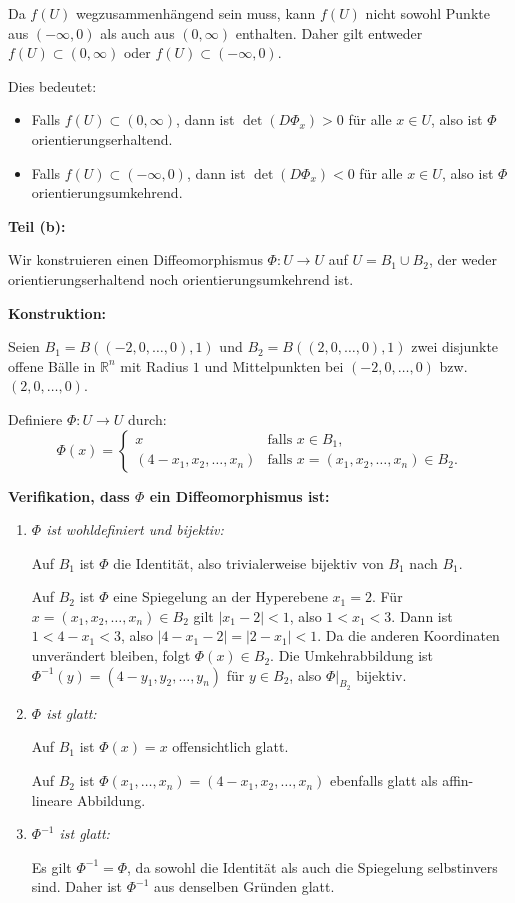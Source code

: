 \documentclass{article}
\newcommand{\R}{\mathbb{R}}
\begin{document}
Da $f(U)$ wegzusammenhängend sein muss, kann $f(U)$ nicht sowohl Punkte aus $(-\infty, 0)$ als auch aus $(0, \infty)$ enthalten. Daher gilt entweder $f(U) \subset (0, \infty)$ oder $f(U) \subset (-\infty, 0)$.

Dies bedeutet:
\begin{itemize}
    \item Falls $f(U) \subset (0, \infty)$, dann ist $\det(D\Phi_x) > 0$ für alle $x \in U$, also ist $\Phi$ orientierungserhaltend.
    \item Falls $f(U) \subset (-\infty, 0)$, dann ist $\det(D\Phi_x) < 0$ für alle $x \in U$, also ist $\Phi$ orientierungsumkehrend.
\end{itemize}

\textbf{Teil (b):}

Wir konstruieren einen Diffeomorphismus $\Phi: U \to U$ auf $U = B_1 \cup B_2$, der weder orientierungserhaltend noch orientierungsumkehrend ist.

\textbf{Konstruktion:}

Seien $B_1 = B((-2, 0, \ldots, 0), 1)$ und $B_2 = B((2, 0, \ldots, 0), 1)$ zwei disjunkte offene Bälle in $\R^n$ mit Radius $1$ und Mittelpunkten bei $(-2, 0, \ldots, 0)$ bzw. $(2, 0, \ldots, 0)$.

Definiere $\Phi: U \to U$ durch:
\[
\Phi(x) = \begin{cases}
    x & \text{falls } x \in B_1, \\
    (4 - x_1, x_2, \ldots, x_n) & \text{falls } x = (x_1, x_2, \ldots, x_n) \in B_2.
\end{cases}
\]

\textbf{Verifikation, dass $\Phi$ ein Diffeomorphismus ist:}

\begin{enumerate}
    \item \textit{$\Phi$ ist wohldefiniert und bijektiv:} 
    
    Auf $B_1$ ist $\Phi$ die Identität, also trivialerweise bijektiv von $B_1$ nach $B_1$.
    
    Auf $B_2$ ist $\Phi$ eine Spiegelung an der Hyperebene $x_1 = 2$. Für $x = (x_1, x_2, \ldots, x_n) \in B_2$ gilt $|x_1 - 2| < 1$, also $1 < x_1 < 3$. Dann ist $1 < 4 - x_1 < 3$, also $|4 - x_1 - 2| = |2 - x_1| < 1$. Da die anderen Koordinaten unverändert bleiben, folgt $\Phi(x) \in B_2$. Die Umkehrabbildung ist $\Phi^{-1}(y) = (4 - y_1, y_2, \ldots, y_n)$ für $y \in B_2$, also $\Phi|_{B_2}$ bijektiv.
    
    \item \textit{$\Phi$ ist glatt:} 
    
    Auf $B_1$ ist $\Phi(x) = x$ offensichtlich glatt.
    
    Auf $B_2$ ist $\Phi(x_1, \ldots, x_n) = (4 - x_1, x_2, \ldots, x_n)$ ebenfalls glatt als affin-lineare Abbildung.
    
    \item \textit{$\Phi^{-1}$ ist glatt:}
    
    Es gilt $\Phi^{-1} = \Phi$, da sowohl die Identität als auch die Spiegelung selbstinvers sind. Daher ist $\Phi^{-1}$ aus denselben Gründen glatt.
\end{enumerate}
\end{document}
